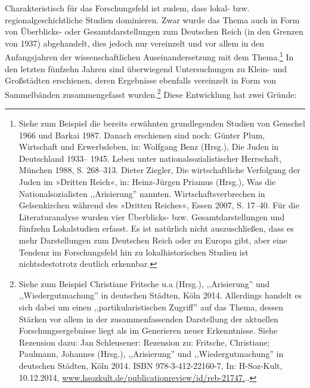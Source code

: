 Charakteristisch für das Forschungsfeld ist zudem, dass lokal- bzw. regionalgeschichtliche Studien dominieren. Zwar wurde das Thema auch in Form von Überblicks- oder Gesamtdarstellungen zum Deutschen Reich (in den Grenzen von 1937) abgehandelt, dies jedoch nur vereinzelt und vor allem in den Anfangsjahren der wissenschaftlichen Auseinandersetzung mit dem Thema.\footnote{Siehe zum Beispiel die bereits erwähnten grundlegenden Studien von Genschel 1966 und Barkai 1987. Danach erschienen sind noch: Günter
Plum, Wirtschaft und Erwerbsleben, in: Wolfgang Benz (Hrsg.), Die Juden in Deutschland 1933–
1945. Leben unter nationalsozialistischer Herrschaft, München 1988, S. 268–313. Dieter Ziegler, Die wirtschaftliche
Verfolgung der Juden im »Dritten Reich«, in: Heinz-Jürgen Priamus (Hrsg.), Was die
Nationalsozialisten ,,Arisierung'' nannten. Wirtschaftsverbrechen in Gelsenkirchen während des
»Dritten Reiches«, Essen 2007, S. 17–40. Für die Literaturanalyse wurden vier Überblicks- bzw. Gesamtdarstellungen und fünfzehn Lokalstudien erfasst. Es ist natürlich nicht auszuschließen, dass es mehr Darstellungen zum Deutschen Reich oder zu Europa gibt, aber eine Tendenz im Forschungsfeld hin zu lokalhistorischen Studien ist nichtsdestotrotz deutlich erkennbar.} In den letzten fünfzehn Jahren sind überwiegend Untersuchungen zu Klein- und Großstädten erschienen, deren Ergebnisse ebenfalls vereinzelt in Form von Sammelbänden zusammengefasst wurden.\footnote{Siehe zum Beispiel Christiane Fritsche u.a (Hrsg.), ,,Arisierung'' und ,,Wiedergutmachung'' in deutschen Städten, Köln 2014. Allerdings handelt es sich dabei um einen ,,partikularistischen Zugriff'' auf das Thema, dessen Stärken vor allem in der zusammenfassenden Darstellung der aktuellen Forschungsergebnisse liegt als im Generieren neuer Erkenntnisse. Siehe Rezension dazu: Jan Schleusener: Rezension zu: Fritsche, Christiane; Paulmann, Johannes (Hrsg.), ,,Arisierung'' und ,,Wiedergutmachung'' in deutschen Städten, Köln  2014. ISBN 978-3-412-22160-7, In: H-Soz-Kult, 10.12.2014, \url{www.hsozkult.de/publicationreview/id/reb-21747.}..} Diese Entwicklung hat zwei Gründe:

